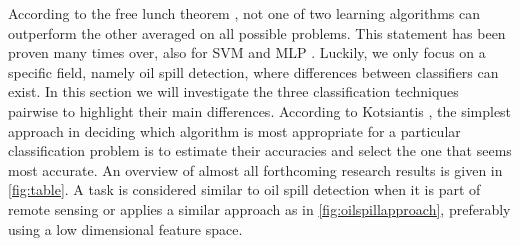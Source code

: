  
According to the free lunch theorem \cite{wolpert1995no}, not one of two learning algorithms can outperform the other averaged on all possible problems. This statement has been proven many times over, also for SVM and MLP \cite{Moavenian20103088,Zanaty2012177,jin2005neural}. Luckily, we only focus on a specific field, namely oil spill detection, where differences between classifiers can exist. In this section we will investigate the three classification techniques pairwise to highlight their main differences. According to Kotsiantis \cite{kotsiantis2007supervised}, the simplest approach in deciding which algorithm is most appropriate for a particular classification problem is to estimate their accuracies and select the one that seems most accurate. An overview of almost all forthcoming research results is given in \ref{fig:table}. A task is considered similar to oil spill detection when it is part of remote sensing or applies a similar approach as in \ref{fig:oilspillapproach}, preferably using a low dimensional feature space.